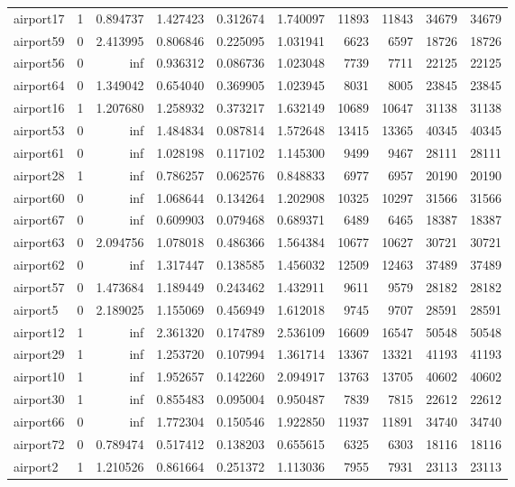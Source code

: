 \begin{longtable}{|l|r|r|r|r|r|r|r|r|r|}
airport17 & 1 & 0.894737 & 1.427423 & 0.312674 & 1.740097 & 11893 & 11843 & 34679 & 34679 \\
airport59 & 0 & 2.413995 & 0.806846 & 0.225095 & 1.031941 & 6623 & 6597 & 18726 & 18726 \\
airport56 & 0 & inf & 0.936312 & 0.086736 & 1.023048 & 7739 & 7711 & 22125 & 22125 \\
airport64 & 0 & 1.349042 & 0.654040 & 0.369905 & 1.023945 & 8031 & 8005 & 23845 & 23845 \\
airport16 & 1 & 1.207680 & 1.258932 & 0.373217 & 1.632149 & 10689 & 10647 & 31138 & 31138 \\
airport53 & 0 & inf & 1.484834 & 0.087814 & 1.572648 & 13415 & 13365 & 40345 & 40345 \\
airport61 & 0 & inf & 1.028198 & 0.117102 & 1.145300 & 9499 & 9467 & 28111 & 28111 \\
airport28 & 1 & inf & 0.786257 & 0.062576 & 0.848833 & 6977 & 6957 & 20190 & 20190 \\
airport60 & 0 & inf & 1.068644 & 0.134264 & 1.202908 & 10325 & 10297 & 31566 & 31566 \\
airport67 & 0 & inf & 0.609903 & 0.079468 & 0.689371 & 6489 & 6465 & 18387 & 18387 \\
airport63 & 0 & 2.094756 & 1.078018 & 0.486366 & 1.564384 & 10677 & 10627 & 30721 & 30721 \\
airport62 & 0 & inf & 1.317447 & 0.138585 & 1.456032 & 12509 & 12463 & 37489 & 37489 \\
airport57 & 0 & 1.473684 & 1.189449 & 0.243462 & 1.432911 & 9611 & 9579 & 28182 & 28182 \\
airport5 & 0 & 2.189025 & 1.155069 & 0.456949 & 1.612018 & 9745 & 9707 & 28591 & 28591 \\
airport12 & 1 & inf & 2.361320 & 0.174789 & 2.536109 & 16609 & 16547 & 50548 & 50548 \\
airport29 & 1 & inf & 1.253720 & 0.107994 & 1.361714 & 13367 & 13321 & 41193 & 41193 \\
airport10 & 1 & inf & 1.952657 & 0.142260 & 2.094917 & 13763 & 13705 & 40602 & 40602 \\
airport30 & 1 & inf & 0.855483 & 0.095004 & 0.950487 & 7839 & 7815 & 22612 & 22612 \\
airport66 & 0 & inf & 1.772304 & 0.150546 & 1.922850 & 11937 & 11891 & 34740 & 34740 \\
airport72 & 0 & 0.789474 & 0.517412 & 0.138203 & 0.655615 & 6325 & 6303 & 18116 & 18116 \\
airport2 & 1 & 1.210526 & 0.861664 & 0.251372 & 1.113036 & 7955 & 7931 & 23113 & 23113 \\

\end{longtable}
